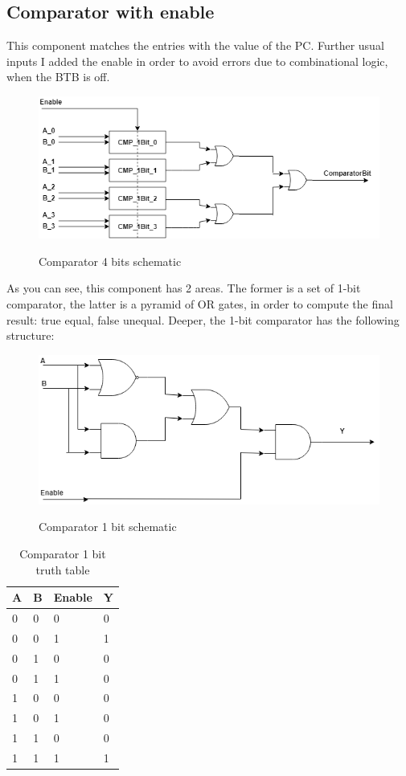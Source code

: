 \subsection{Comparator with enable}
This component matches the entries with the value of the PC. Further usual inputs I added the enable in order to avoid errors due to combinational logic, when the BTB is off.
\begin{figure}[H]
\centering
\includegraphics[scale=.7]{Immagini/12}
\label{12}
\caption{Comparator 4 bits schematic}
\end{figure}
As you can see, this component has 2 areas. The former is a set of 1-bit comparator, the latter is a pyramid of OR gates, in order to compute the final result: true equal, false unequal. \newline
Deeper, the 1-bit comparator has the following structure:
\begin{figure}[H]
\centering
\includegraphics[scale=.7]{Immagini/13}
\label{13}
\caption{Comparator 1 bit schematic}
\end{figure}
\begin{table}[H]
\centering
\begin{tabular}{|p{}|p{}|p{}|p{}|}
\hline
\textbf{A}&\textbf{\textbf{B}}&\textbf{Enable}&\textbf{Y}\\ \hline
0 & 0 & 0 & 0\\ \hline
0 & 0 & 1 & 1\\ \hline
0 & 1 & 0 & 0\\ \hline
0 & 1 & 1 & 0\\ \hline
1 & 0 & 0 & 0\\ \hline
1 & 0 & 1 & 0\\ \hline
1 & 1 & 0 & 0\\ \hline
1 & 1 & 1 & 1\\ \hline

\end{tabular}
\caption{Comparator 1 bit truth table}
\end{table}

